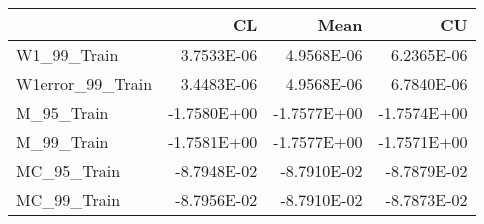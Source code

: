 \begin{tabular}{lrrr}
\toprule
{} &          CL &        Mean &          CU \\
\midrule
W1\_99\_Train      &  3.7533E-06 &  4.9568E-06 &  6.2365E-06 \\
W1error\_99\_Train &  3.4483E-06 &  4.9568E-06 &  6.7840E-06 \\
M\_95\_Train       & -1.7580E+00 & -1.7577E+00 & -1.7574E+00 \\
M\_99\_Train       & -1.7581E+00 & -1.7577E+00 & -1.7571E+00 \\
MC\_95\_Train      & -8.7948E-02 & -8.7910E-02 & -8.7879E-02 \\
MC\_99\_Train      & -8.7956E-02 & -8.7910E-02 & -8.7873E-02 \\
\bottomrule
\end{tabular}
